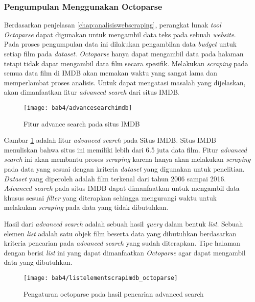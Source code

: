 \subsubsection{Pengumpulan Menggunakan Octoparse}
Berdasarkan penjelasan \ref{chap:analisiswebscraping}, perangkat lunak \textit{tool} \textit{Octoparse} dapat digunakan untuk mengambil data teks pada sebuah \textit{website}. Pada proses pengumpulan data ini dilakukan pengambilan data \textit{budget} untuk setiap film pada \textit{dataset}.  \textit{Octoparse} hanya dapat mengambil data pada halaman tetapi tidak dapat mengambil data film secara spesifik. Melakukan \textit{scraping} pada semua data film di IMDB akan memakan waktu yang sangat lama dan memperlambat proses analisis. Untuk dapat mengatasi masalah yang dijelaskan, akan dimanfaatkan fitur \textit{advanced search} dari situs IMDB. 


\begin{figure}[H]
	\centering  
	\texttt{[image: bab4/advancesearchimdb]}   
	\caption{Fitur advance search pada situs IMDB}
	\label{fig:advancesearchimdb} 
\end{figure} 


Gambar \ref{fig:advancesearchimdb} adalah fitur \textit{advanced search} pada Situs IMDB. Situs IMDB menuliskan bahwa situs ini memiliki lebih dari 6.5 juta data film. Fitur \textit{advanced search} ini akan membantu proses \textit{scraping} karena hanya akan melakukan \textit{scraping} pada data yang sesuai dengan kriteria \textit{dataset} yang digunakan untuk penelitian. \textit{Dataset} yang diperoleh adalah film terkenal dari tahun 2006 sampai 2016. \textit{Advanced search} pada situs IMDB dapat dimanfaatkan untuk mengambil data khusus sesuai \textit{filter} yang diterapkan sehingga mengurangi waktu untuk melakukan \textit{scraping} pada data yang tidak dibutuhkan.



Hasil dari \textit{advanced search} adalah sebuah hasil \textit{query} dalam bentuk \textit{list}. Sebuah elemen \textit{list} adalah satu objek film beserta data yang dibutuhkan berdasarkan kriteria pencarian pada \textit{advanced search} yang sudah diterapkan. Tipe halaman dengan berisi \textit{list} ini yang dapat dimanfaatkan \textit{Octoparse} agar dapat mengambil data yang dibutuhkan. 

  
\begin{figure}[H]
	\centering  
	\texttt{[image: bab4/listelementscrapimdb\_octoparse]}   
	\caption{Pengaturan octoparse pada hasil pencarian advanced search }
	\label{fig:listelementscrapimdb_octoparse} 
\end{figure} 

